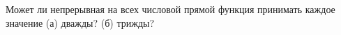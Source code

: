 \documentclass{article}
\begin{document}
Может ли непрерывная на всех числовой прямой функция принимать каждое значение (а) дважды? (б) трижды?
\end{document}
